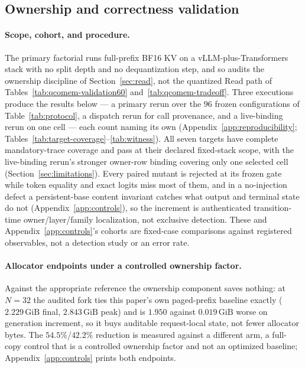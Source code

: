 \documentclass{article}
\newcommand{\gib}{\,\mathrm{GiB}}
\begin{document}
\subsection{Ownership and correctness validation}
\label{sec:correctness}
\label{sec:results}

\paragraph{Scope, cohort, and procedure.} \label{sec:target-status} The primary
factorial runs full-prefix BF16 KV on a vLLM-plus-Transformers stack with no
split depth and no dequantization step, and so audits the ownership discipline
of Section~\ref{sec:read}, not the quantized Read path of
Tables~\ref{tab:qcomem-validation60} and~\ref{tab:qcomem-tradeoff}.  Three
executions produce the results below --- a primary rerun over the $96$ frozen
configurations of Table~\ref{tab:protocol}, a dispatch rerun for call
provenance, and a live-binding rerun on one cell --- each count naming its own
(Appendix~\ref{app:reproducibility};
Tables~\ref{tab:target-coverage}--\ref{tab:witness}).  All seven targets have
complete mandatory-trace coverage and pass at their declared fixed-stack scope,
with the live-binding rerun's stronger owner-row binding covering only one
selected cell (Section~\ref{sec:limitations}).  Every paired mutant is rejected
at its frozen gate while token equality and exact logits miss most of them, and
in a no-injection defect a persistent-base content invariant catches what output
and terminal state do not (Appendix~\ref{app:controls}), so the increment is
authenticated transition-time owner/layer/family localization, not exclusive
detection.  These and Appendix~\ref{app:controls}'s cohorts are fixed-case
comparisons against registered observables, not a detection study or an error
rate.

\paragraph{Allocator endpoints under a controlled ownership factor.}
Against the appropriate reference the ownership component saves nothing: at
$N=32$ the audited fork ties this paper's own paged-prefix baseline exactly
($2.229\gib$ final, $2.843\gib$ peak) and is $1.950$ against $0.019\gib$ worse
on generation increment, so it buys auditable request-local state, not fewer
allocator bytes.  The $54.5\%$/$42.2\%$ reduction is measured against a
different arm, a full-copy control that is a controlled ownership factor and not
an optimized baseline; Appendix~\ref{app:controls} prints both endpoints.
\end{document}
